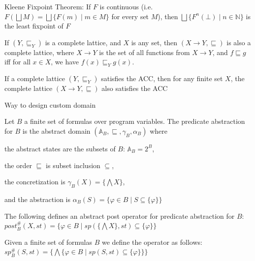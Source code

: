 \documentclass[landscape, a4paper]{article}
\begin{document}
\begin{minipage}[t]{0.2\linewidth}
\begin{betterlist}
\begin{betterlist}
      \item \color{orange}\alert{Kleene Fixpoint Theorem}: If $F$ is continuous (i.e. $F(\bigsqcup M) = \bigsqcup \{F(m) \mid m \in M\}$ for every set $M$), then $\bigsqcup\{F^n(\bot) \mid n \in \mathbb{N}\}$ is the least fixpoint of $F$\color{black}
			\item {}
		\end{betterlist}
		\item If $(Y, \sqsubseteq_Y)$ is a complete lattice, and $X$ is any set, then $(X\rightarrow Y, \sqsubseteq)$ is also a complete lattice, where $X \rightarrow Y$ is the set of all functions from $X \rightarrow Y$, and $f \sqsubseteq g$ iff for all $x \in X$, we have $f(x) \sqsubseteq_Y g(x)$. 
		\item If a complete lattice $(Y , \sqsubseteq_Y)$ satisfies the ACC, then for any finite set $X$, the complete lattice $(X \rightarrow Y , \sqsubseteq)$ also satisfies the ACC
	\end{betterlist}
	\begin{betterlist}
		\item Way to design custom domain
		\item Let $B$ a finite set of formulas over program variables. The \alert{predicate abstraction for $B$} is the abstract domain $(\mathbb{A}_B, \sqsubseteq, \gamma_B, \alpha_B)$ where
		\begin{betterlist}
			\item the abstract states are the subsets of $B$: $\mathbb{A}_B = 2^B$,
			\item the order $\sqsubseteq$ is subset inclusion $\subseteq$,
			\item the concretization is $\gamma_B(X) = \{\bigwedge X\}$,
			\item and the abstraction is $\alpha_B(S) = \{\varphi \in B \mid S \subseteq \{\varphi\}\}$
		\end{betterlist}
  \item \color{violet}The following defines an \alert{abstract post operator} for predicate abstraction for $B$: $post^\#_B(X, st) = \{\varphi \in B \mid sp(\{\bigwedge X\}, st) \subseteq \{\varphi\}\}$\color{black}
  \item \color{orange}Given a finite set of formulas $B$ we define the  operator as follows: $sp^\#_B(S, st) = \{\bigwedge \{\varphi \in B \mid sp(S, st) \subseteq \{\varphi\}\}\}$\color{black}
		\begin{betterlist}

\end{betterlist}
\end{betterlist}
\end{minipage}
\end{document}
